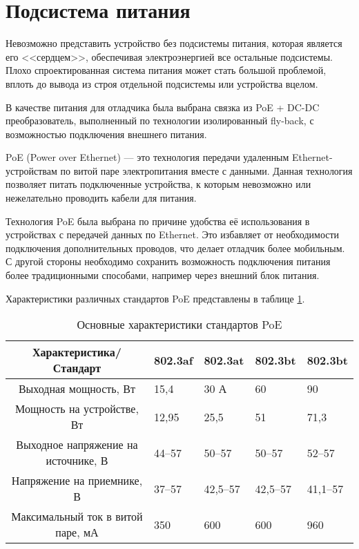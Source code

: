 \section{Подсистема питания}
\hspace{1cm} 

Невозможно представить устройство без подсистемы питания, которая является его <<сердцем>>,
обеспечивая электроэнергией все остальные подсистемы. Плохо спроектированная система питания
может стать большой проблемой, вплоть до вывода из строя отдельной подсистемы или устройства
вцелом.

В качестве питания для отладчика была выбрана связка из PoE + DC-DC преобразователь, 
выполненный по технологии изолированный fly-back, с возможностью подключения внешнего питания. 

PoE (Power over Ethernet) — это технология передачи удаленным Ethernet-устройствам по 
витой паре электропитания вместе с данными. Данная технология позволяет питать подключенные 
устройства, к которым невозможно или нежелательно проводить кабели для питания.

Технология PoE была выбрана по причине  удобства её использования в устройствах с передачей
данных по Ethernet. Это избавляет от необходимости подключения дополнительных проводов, что
делает отладчик более мобильным. С другой стороны необходимо сохранить возможность подключения
питания более традиционными способами, например через внешний блок питания.

Характеристики различных стандартов PoE представлены в таблице \ref{PoE}.

\begin{table}[H]
    \caption{Основные характеристики стандартов PoE} 
    \label{PoE}
    \begin{center}
    \begin{tabular}{|c|p{2cm}|p{2cm}|p{2cm}|p{2cm}|}
    \hline
  Характеристика/Стандарт & 802.3af  &  802.3at  & 802.3bt & 802.3bt \\ \hline
    Выходная мощность, Вт & 15,4  & 30 А & 60 &  90 \\ \hline
    Мощность на устройстве, Вт & 12,95 & 25,5 & 51 & 71,3  \\ \hline
    Выходное напряжение на источнике, В & 44--57 & 50--57 & 50--57 & 52--57 \\ \hline
    Напряжение на приемнике, В & 37--57 & 42,5--57 & 42,5--57 & 41,1--57  \\ \hline
    Максимальный ток в витой паре, мА & 350 & 600 & 600 & 960  \\ \hline
    \end{tabular}
    \end{center}
\end{table} 


